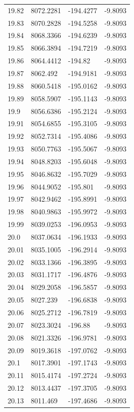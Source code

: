 \begin{table}[H]
\begin{tabular}{llll}
19.82 & 8072.2281 & -194.4277 & -9.8093 \\
19.83 & 8070.2828 & -194.5258 & -9.8093 \\
19.84 & 8068.3366 & -194.6239 & -9.8093 \\
19.85 & 8066.3894 & -194.7219 & -9.8093 \\
19.86 & 8064.4412 & -194.82 & -9.8093 \\
19.87 & 8062.492 & -194.9181 & -9.8093 \\
19.88 & 8060.5418 & -195.0162 & -9.8093 \\
19.89 & 8058.5907 & -195.1143 & -9.8093 \\
19.9 & 8056.6386 & -195.2124 & -9.8093 \\
19.91 & 8054.6855 & -195.3105 & -9.8093 \\
19.92 & 8052.7314 & -195.4086 & -9.8093 \\
19.93 & 8050.7763 & -195.5067 & -9.8093 \\
19.94 & 8048.8203 & -195.6048 & -9.8093 \\
19.95 & 8046.8632 & -195.7029 & -9.8093 \\
19.96 & 8044.9052 & -195.801 & -9.8093 \\
19.97 & 8042.9462 & -195.8991 & -9.8093 \\
19.98 & 8040.9863 & -195.9972 & -9.8093 \\
19.99 & 8039.0253 & -196.0953 & -9.8093 \\
20.0 & 8037.0634 & -196.1933 & -9.8093 \\
20.01 & 8035.1005 & -196.2914 & -9.8093 \\
20.02 & 8033.1366 & -196.3895 & -9.8093 \\
20.03 & 8031.1717 & -196.4876 & -9.8093 \\
20.04 & 8029.2058 & -196.5857 & -9.8093 \\
20.05 & 8027.239 & -196.6838 & -9.8093 \\
20.06 & 8025.2712 & -196.7819 & -9.8093 \\
20.07 & 8023.3024 & -196.88 & -9.8093 \\
20.08 & 8021.3326 & -196.9781 & -9.8093 \\
20.09 & 8019.3618 & -197.0762 & -9.8093 \\
20.1 & 8017.3901 & -197.1743 & -9.8093 \\
20.11 & 8015.4174 & -197.2724 & -9.8093 \\
20.12 & 8013.4437 & -197.3705 & -9.8093 \\
20.13 & 8011.469 & -197.4686 & -9.8093 \\

\end{tabular}
\end{table}
